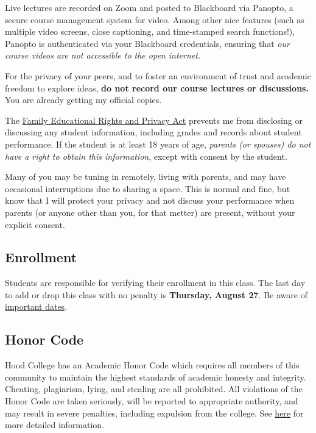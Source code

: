 \documentclass{article}
\begin{document}
Live lectures are recorded on Zoom and posted to Blackboard via Panopto,
a secure course management system for video. Among other nice features
(such as multiple video screens, close captioning, and time-stamped
search functions!), Panopto is authenticated via your Blackboard
credentials, ensuring that \emph{our course videos are not accessible to
the open internet.}

For the privacy of your peers, and to foster an environment of trust and
academic freedom to explore ideas, \textbf{do not record our course
lectures or discussions.} You are already getting my official copies.

The
\href{https://www2.ed.gov/policy/gen/guid/fpco/ferpa/index.html}{Family
Educational Rights and Privacy Act} prevents me from disclosing or
discussing any student information, including grades and records about
student performance. If the student is at least 18 years of age,
\emph{parents (or spouses) do not have a right to obtain this
information}, except with consent by the student.

Many of you may be tuning in remotely, living with parents, and may have
occasional interruptions due to sharing a space. This is normal and
fine, but know that I will protect your privacy and not discuss your
performance when parents (or anyone other than you, for that metter) are
present, without your explicit consent.

\hypertarget{enrollment}{%
\subsection*{Enrollment}\label{enrollment}}

Students are responsible for verifying their enrollment in this class.
The last day to add or drop this class with no penalty is
\textbf{Thursday, August 27}. Be aware of
\href{https://www.hood.edu/offices-services/registrars-office/academic-calendar}{important
dates}.

\hypertarget{honor-code}{%
\subsection*{Honor Code}\label{honor-code}}

Hood College has an Academic Honor Code which requires all members of
this community to maintain the highest standards of academic honesty and
integrity. Cheating, plagiarism, lying, and stealing are all prohibited.
All violations of the Honor Code are taken seriously, will be reported
to appropriate authority, and may result in severe penalties, including
expulsion from the college. See
\href{http://hood.smartcatalogiq.com/en/2016-2017/Catalog/The-Spirit-of-Hood/The-Academic-Honor-Code-and-Code-of-Conduct}{here}
for more detailed information.
\end{document}
